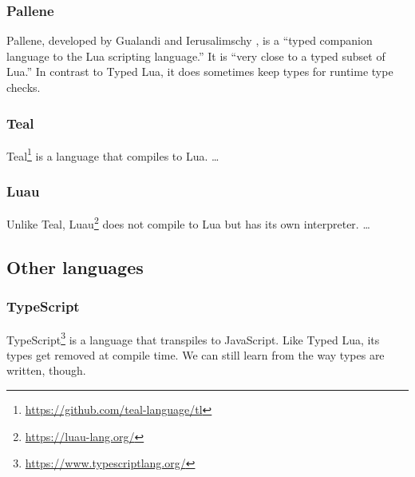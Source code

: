 \subsubsection{Pallene}
Pallene, developed by Gualandi and Ierusalimschy \cite{gualandi2020pallene}, is a ``typed companion language to the Lua scripting language.'' It is ``very close to a typed subset of Lua.'' In contrast to Typed Lua, it does sometimes keep types for runtime type checks.

\subsubsection{Teal}
Teal\footnote{\url{https://github.com/teal-language/tl}} is a language that compiles to Lua. \dots {}

\subsubsection{Luau}
Unlike Teal, Luau\footnote{\url{https://luau-lang.org/}} does not compile to Lua but has its own interpreter. \dots {}

\subsection{Other languages}
\subsubsection{TypeScript}
TypeScript\footnote{\url{https://www.typescriptlang.org/}} is a language that transpiles to JavaScript. Like Typed Lua, its types get removed at compile time. We can still learn from the way types are written, though.
